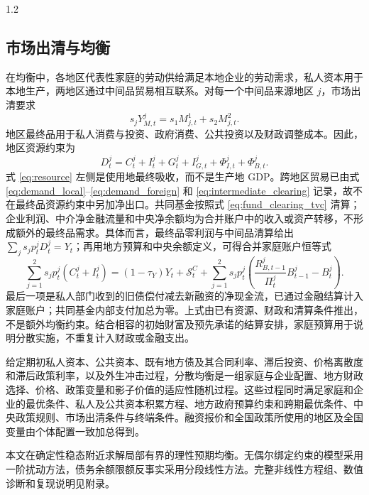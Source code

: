 \documentclass[12pt,UTF8]{ctexart}
\begin{document}
\begin{spacing}{1.2}
		\subsection{市场出清与均衡}
		
		在均衡中，各地区代表性家庭的劳动供给满足本地企业的劳动需求，私人资本用于本地生产，两地区通过中间品贸易相互联系。对每一个中间品来源地区 $j$，市场出清要求
		\begin{equation}
			s_jY_{M,t}^j=s_1M_{j,t}^1+s_2M_{j,t}^2.
			\label{eq:intermediate_clearing}
		\end{equation}
		地区最终品用于私人消费与投资、政府消费、公共投资以及财政调整成本。因此，地区资源约束为
		\begin{equation}
			D_t^j=C_t^j+I_t^j+G_t^j+I_{G,t}^j+\Phi_{I,t}^j+\Phi_{B,t}^j.
			\label{eq:resource}
		\end{equation}
		式 \eqref{eq:resource} 左侧是使用地最终吸收，而不是生产地 GDP。跨地区贸易已由式 \eqref{eq:demand_local}--\eqref{eq:demand_foreign} 和 \eqref{eq:intermediate_clearing} 记录，故不在最终品资源约束中另加净出口。共同基金按照式 \eqref{eq:fund_clearing_tvc} 清算；企业利润、中介净金融流量和中央净余额均为合并账户中的收入或资产转移，不形成额外的最终品需求。具体而言，最终品零利润与中间品清算给出 $\sum_js_jp_t^jD_t^j=Y_t$；再用地方预算和中央余额定义，可得合并家庭账户恒等式
		\begin{equation}
			\sum_{j=1}^2s_jp_t^j(C_t^j+I_t^j)
			=(1-\tau_Y)Y_t+\mathcal S_t^C
			+\sum_{j=1}^2s_jp_t^j\left(\frac{R_{B,t-1}^j}{\Pi_t^j}B_{t-1}^j-B_t^j\right).
			\label{eq:consolidated_household_account}
		\end{equation}
		最后一项是私人部门收到的旧债偿付减去新融资的净现金流，已通过金融结算计入家庭账户；共同基金内部支付加总为零。上式由已有资源、财政和清算条件推出，不是额外均衡约束。结合相容的初始财富及预先承诺的结算安排，家庭预算用于说明分散实施，不重复计入财政或金融支出。
		
		给定期初私人资本、公共资本、既有地方债及其合同利率、滞后投资、价格离散度和滞后政策利率，以及外生冲击过程，分散均衡是一组家庭与企业配置、地方财政选择、价格、政策变量和影子价值的适应性随机过程。这些过程同时满足家庭和企业的最优条件、私人及公共资本积累方程、地方政府预算约束和跨期最优条件、中央政策规则、市场出清条件与终端条件。融资报价和全国政策所使用的地区及全国变量由个体配置一致加总得到。
		
		本文在确定性稳态附近求解局部有界的理性预期均衡。无偶尔绑定约束的模型采用一阶扰动方法，债务余额限额反事实采用分段线性方法。完整非线性方程组、数值诊断和复现说明见附录。
		

\end{spacing}
\end{document}
